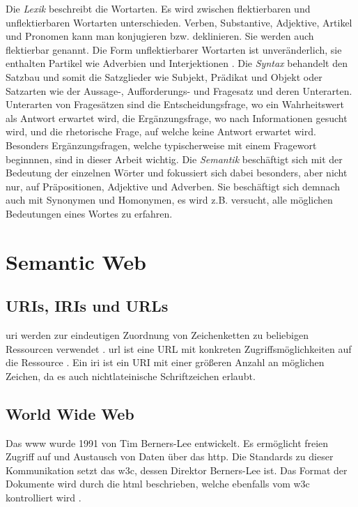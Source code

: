 Die \emph{Lexik} beschreibt die Wortarten.
Es wird zwischen flektierbaren und unflektierbaren Wortarten unterschieden.
Verben, Substantive, Adjektive, Artikel und Pronomen kann man konjugieren bzw. deklinieren.
Sie werden auch flektierbar genannt.
Die Form unflektierbarer Wortarten ist unveränderlich, sie enthalten Partikel wie Adverbien und Interjektionen \citep[S.~505]{deutschbuch}.
Die \emph{Syntax} behandelt den Satzbau und somit die Satzglieder wie Subjekt, Prädikat und Objekt oder Satzarten wie der Aussage-, Aufforderungs- und Fragesatz und deren Unterarten.
Unterarten von Fragesätzen sind  die Entscheidungsfrage, wo ein Wahrheitswert als Antwort erwartet wird, die Ergänzungsfrage, wo nach Informationen gesucht wird, und die rhetorische Frage, auf welche keine Antwort erwartet wird.
Besonders Ergänzungsfragen, welche typischerweise mit einem Fragewort beginnnen, sind in dieser Arbeit wichtig.
Die \emph{Semantik} beschäftigt sich mit der Bedeutung der einzelnen Wörter und fokussiert sich dabei besonders, aber nicht nur, auf Präpositionen, Adjektive und Adverben.
Sie beschäftigt sich demnach auch mit Synonymen und Homonymen, es wird z.B. versucht, alle möglichen Bedeutungen eines Wortes zu erfahren.

\section{Semantic Web}

\subsection{URIs, IRIs und URLs}
\ac{uri} werden zur eindeutigen Zuordnung von Zeichenketten zu beliebigen Ressourcen verwendet \citep{uri}.
\ac{url} ist eine URL mit konkreten Zugriffsmöglichkeiten auf die Ressource \citep{url}.
Ein \ac{iri} ist ein URI mit einer größeren Anzahl an möglichen Zeichen, da es auch nichtlateinische Schriftzeichen erlaubt.

\subsection{World Wide Web}
Das \ac{www} wurde 1991 von Tim Berners-Lee entwickelt.
Es ermöglicht freien Zugriff auf und Austausch von Daten über das \ac{http}.
Die Standards zu dieser Kommunikation setzt das \ac{w3c}, dessen Direktor Berners-Lee ist.
Das Format der Dokumente wird durch die \ac{html} beschrieben, welche ebenfalls vom \ac{w3c} kontrolliert wird \citep{www}.

